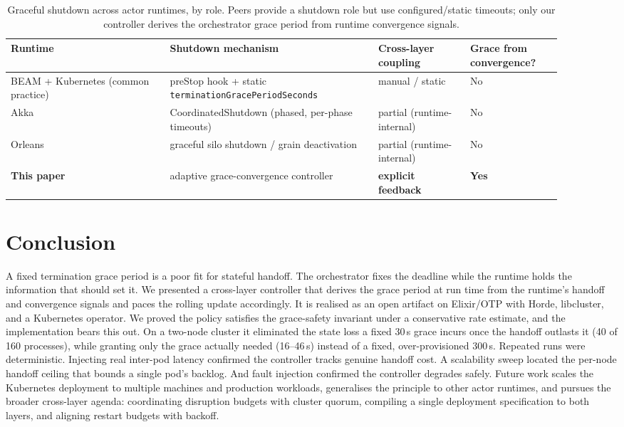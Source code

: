 \documentclass[AMA,Times1COL]{WileyNJDv5}
\begin{document}
\begin{table}[t]
\centering
\caption{Graceful shutdown across actor runtimes, by role. Peers provide a
shutdown role but use configured/static timeouts; only our controller derives the orchestrator
grace period from runtime convergence signals.}\label{tab:actor-compare}
\begin{tabular}{@{}p{0.26\linewidth}p{0.34\linewidth}p{0.15\linewidth}p{0.15\linewidth}@{}}
\toprule
\textbf{Runtime} & \textbf{Shutdown mechanism} & \textbf{Cross-layer coupling} & \textbf{Grace from convergence?} \\
\midrule
BEAM + Kubernetes (common practice) & preStop hook + static \texttt{terminationGracePeriodSeconds} & manual / static & No \\
Akka & CoordinatedShutdown (phased, per-phase timeouts) & partial (runtime-internal) & No \\
Orleans & graceful silo shutdown / grain deactivation & partial (runtime-internal) & No \\
\textbf{This paper} & adaptive grace-convergence controller & \textbf{explicit feedback} & \textbf{Yes} \\
\bottomrule
\end{tabular}
\end{table}

\section{Conclusion}\label{sec:conc}
A fixed termination grace period is a poor fit for stateful handoff. The orchestrator
fixes the deadline while the runtime holds the information that should set it. We presented a
cross-layer controller that derives the grace period at run time from the runtime's handoff and
convergence signals and paces the rolling update accordingly. It is realised as an open artifact on
Elixir/OTP with Horde, libcluster, and a Kubernetes operator. We proved the policy satisfies the
grace-safety invariant under a conservative rate estimate, and the implementation bears this out. On a
two-node cluster it eliminated the state loss a fixed 30\,s grace incurs once the handoff outlasts it
(40 of 160 processes), while granting only the grace actually needed (16--46\,s) instead of a fixed,
over-provisioned 300\,s. Repeated runs were deterministic. Injecting real inter-pod latency confirmed
the controller tracks genuine handoff cost. A scalability sweep located the per-node handoff ceiling
that bounds a single pod's backlog. And fault injection confirmed the controller degrades safely.
Future work scales the Kubernetes deployment to multiple machines and production workloads,
generalises the principle to other actor runtimes, and pursues the broader cross-layer agenda:
coordinating disruption budgets with cluster quorum, compiling a single deployment specification to
both layers, and aligning restart budgets with backoff.
\end{document}
